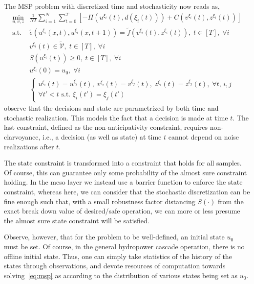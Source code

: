 \documentclass{article}
\newcommand{\1}{\mathds{1}}          %
\theoremstyle{definition}
\begin{document}
\begin{sloppypar}
The MSP problem with discretized time and stochasticity now reads as,
\begin{equation}\label{eq:msp}
\begin{array}{rl}
\min\limits_{u,v,z} 
& \frac{1}{NT}\sum\limits_{i=1}^N\sum_{t=0}^T 
\left[-\Pi(u^{\xi_i}(t),d(\xi_i(t)))+C(v^{\xi_i}(t),z^{\xi_i}(t))\right] \\[0.5em]
\text{s.t. } 
& \tilde{e}(u^{\xi_i}(x,t),u^{\xi_i}(x,t+1))
= \tilde{f}(v^{\xi_i}(t),z^{\xi_i}(t)),\; t\in[T],\;\forall i \\ 
& v^{\xi_i}(t)\in\tilde{\mathcal{V}},\; t\in[T],\;\forall i \\
& S(u^{\xi_i}(t))\ge 0,\; t\in[T],\;\forall i \\
& u^{\xi_i}(0) = u_0,\;\forall i \\
& \left\{
\begin{array}{l}
u^{\xi_i}(t)=u^{\xi_j}(t),\;
v^{\xi_i}(t)=v^{\xi_j}(t),\;
z^{\xi_i}(t)=z^{\xi_j}(t),\;\forall t,\, i,j \\
\forall t'<t \text{ s.t. } \xi_i(t')=\xi_j(t')
\end{array}
\right.
\end{array}
\end{equation}
observe that the decisions and state are parametrized by both time and stochastic realization. This models the fact that a decision is made at time $t$. The last constraint, defined as the non-anticipativity constraint, requires non-clarvoyance, i.e., a decision (as well as state) at time $t$ cannot depend on noise realizations after $t$. 

The state constraint is transformed into a constraint that holds for all samples. Of course, this can guarantee only some probability of the almost sure constraint holding. In the meso layer we instead use a barrier function to enforce the state constraint, whereas here, we can consider that the stochastic discretization can be fine enough such that, with a small robustness factor distancing $S(\cdot)$ from the exact break down value of desired/safe operation, we can more or less presume the almost sure state constraint will be satisfied. 

Observe, however, that for the problem to be well-defined, an initial state $u_0$ must be set. Of course, in the general hydropower cascade operation, there is no offline initial state. Thus, one can simply take statistics of the history of the states through observations, and devote resources of computation towards solving~\eqref{eq:msp} as according to the distribution of various states being set as $u_0$.



\end{sloppypar}
\end{document}
